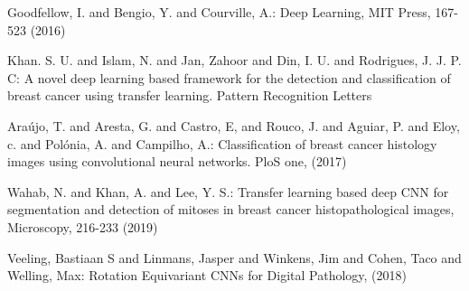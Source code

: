 \documentclass[runningheads]{llncs}
\begin{document}
\begin{thebibliography}{8}


Goodfellow, I. and Bengio, Y. and Courville, A.: Deep Learning, MIT Press, 167-523 (2016)

Khan. S. U. and Islam, N. and Jan, Zahoor and Din, I. U. and Rodrigues, J. J. P. C: A novel deep learning based framework for the detection and classification of breast cancer using transfer learning. Pattern Recognition Letters

Ara{\'u}jo, T. and Aresta, G. and Castro, E, and Rouco, J. and Aguiar, P. and Eloy, c. and Pol{\'o}nia, A. and Campilho, A.: Classification of breast cancer histology images using convolutional neural networks. PloS one, (2017)

Wahab, N. and Khan, A. and Lee, Y. S.: Transfer learning based deep CNN for segmentation and detection of mitoses in breast cancer histopathological images, Microscopy, 216-233 (2019)

Veeling, Bastiaan S and Linmans, Jasper and Winkens, Jim and Cohen, Taco and Welling, Max: Rotation Equivariant {CNNs} for Digital Pathology, (2018)






\end{thebibliography}
\end{document}
